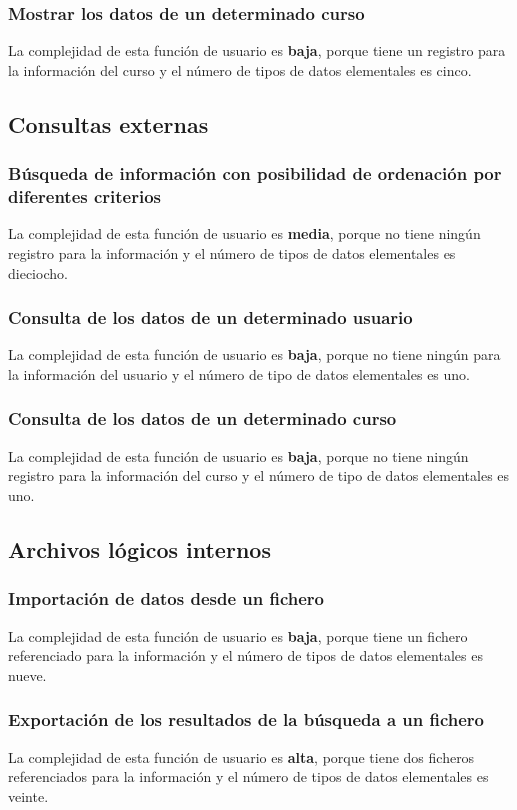 \documentclass[11pt,a4paper,spanish,twoside]{book}
\begin{document}
\subsubsection{Mostrar los datos de un determinado curso}
La complejidad de esta función de usuario es \textbf{baja}, porque tiene un
registro para la información del curso y el número de tipos de datos
elementales es cinco.

\subsection{Consultas externas}
\subsubsection{Búsqueda de información con posibilidad de ordenación por
  diferentes criterios}
La complejidad de esta función de usuario es \textbf{media}, porque no tiene
ningún registro para la información y el número de tipos de datos elementales
es dieciocho.

\subsubsection{Consulta de los datos de un determinado usuario}
La complejidad de esta función de usuario es \textbf{baja}, porque no tiene
ningún para la información del usuario y el número de tipo de datos
elementales es uno.

\subsubsection{Consulta de los datos de un determinado curso}
La complejidad de esta función de usuario es \textbf{baja}, porque no tiene
ningún registro para la información del curso y el número de tipo de datos
elementales es uno.

\subsection{Archivos lógicos internos}
\subsubsection{Importación de datos desde un fichero}
La complejidad de esta función de usuario es \textbf{baja}, porque tiene un
fichero referenciado para la información y el número de tipos de datos
elementales es nueve.

\subsubsection{Exportación de los resultados de la búsqueda a un fichero}
La complejidad de esta función de usuario es \textbf{alta}, porque tiene dos
ficheros referenciados para la información y el número de tipos de datos
elementales es veinte.
\end{document}
